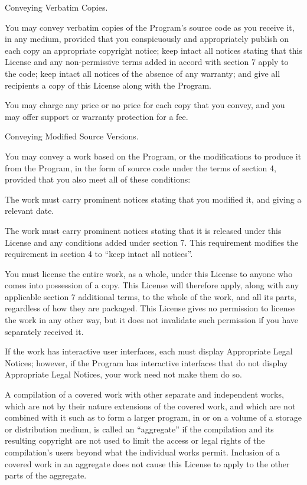 \item Conveying Verbatim Copies.

You may convey verbatim copies of the Program's source code as you receive it, in any medium, provided that you conspicuously and appropriately publish on each copy an appropriate copyright notice; keep intact all notices stating that this License and any non-permissive terms added in accord with section 7 apply to the code; keep intact all notices of the absence of any warranty; and give all recipients a copy of this License along with the Program.

You may charge any price or no price for each copy that you convey, and you may offer support or warranty protection for a fee.

\item Conveying Modified Source Versions.

You may convey a work based on the Program, or the modifications to produce it from the Program, in the form of source code under the terms of section 4, provided that you also meet all of these conditions:
  \startitemize[n][]
  \item The work must carry prominent notices stating that you modified it, and giving a relevant date.

  \item The work must carry prominent notices stating that it is released under this License and any conditions added under section 7.  This requirement modifies the requirement in section 4 to ``keep intact all notices''.

  \item You must license the entire work, as a whole, under this License to anyone who comes into possession of a copy.  This License will therefore apply, along with any applicable section 7 additional terms, to the whole of the work, and all its parts, regardless of how they are packaged.  This License gives no permission to license the work in any other way, but it does not invalidate such permission if you have separately received it.

  \item If the work has interactive user interfaces, each must display Appropriate Legal Notices; however, if the Program has interactive interfaces that do not display Appropriate Legal Notices, your work need not make them do so.
  \stopitemize

A compilation of a covered work with other separate and independent works, which are not by their nature extensions of the covered work, and which are not combined with it such as to form a larger program, in or on a volume of a storage or distribution medium, is called an ``aggregate'' if the compilation and its resulting copyright are not used to limit the access or legal rights of the compilation's users beyond what the individual works permit.  Inclusion of a covered work in an aggregate does not cause this License to apply to the other parts of the aggregate.

